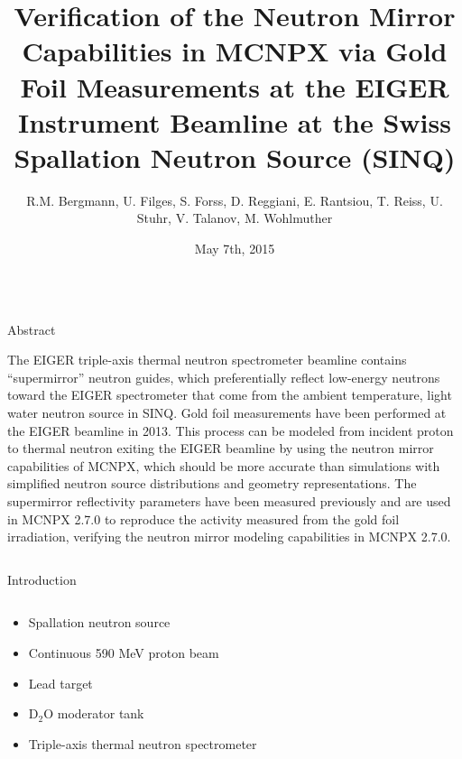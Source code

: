 \documentclass[final,t]{beamer}
\title{\huge Verification of the Neutron Mirror Capabilities in MCNPX via Gold Foil Measurements at the EIGER Instrument Beamline at the Swiss Spallation Neutron Source (SINQ) } %
\author{R.M. Bergmann, U. Filges, S. Forss, D. Reggiani, E. Rantsiou, T. Reiss, U. Stuhr, V. Talanov, M. Wohlmuther} %
\institute[PSI]{Paul Scherrer Institut, Villigen, Switzerland}
\date[May 7th, 2015]{May 7th, 2015}
\begin{document}
\begin{frame}{} 

\begin{columns}[t]

\begin{column}{.96\linewidth}
\begin{block}{Abstract}

The EIGER triple-axis thermal neutron spectrometer beamline contains ``supermirror'' neutron guides, which preferentially reflect low-energy neutrons toward the EIGER spectrometer that come from the ambient temperature, light water neutron source in SINQ.  Gold foil measurements have been performed at the EIGER beamline in 2013.  This process can be modeled from incident proton to thermal neutron exiting the EIGER beamline by using the neutron mirror capabilities of MCNPX, which should be more accurate than simulations with simplified neutron source distributions and geometry representations.  The supermirror reflectivity parameters have been measured previously and are used in MCNPX 2.7.0 to reproduce the activity measured from the gold foil irradiation, verifying the neutron mirror modeling capabilities in MCNPX 2.7.0.

\end{block}
\end{column}
\end{columns}

\vspace{2ex}

  \begin{columns}[t]
    \begin{column}{.3\linewidth}


      \begin{block}{Introduction}

\begin{columns}
\begin{column}{.5\linewidth}
\begin{itemize}
  \item Spallation neutron source
  \item Continuous 590 MeV proton beam
  \item Lead target
  \item D$_2$O moderator tank  
\end{itemize}

\begin{itemize}
\item Triple-axis thermal neutron spectrometer 
\end{itemize}


\end{column}
\end{columns}
\end{block}
\end{column}
\end{columns}
\end{frame}
\end{document}
